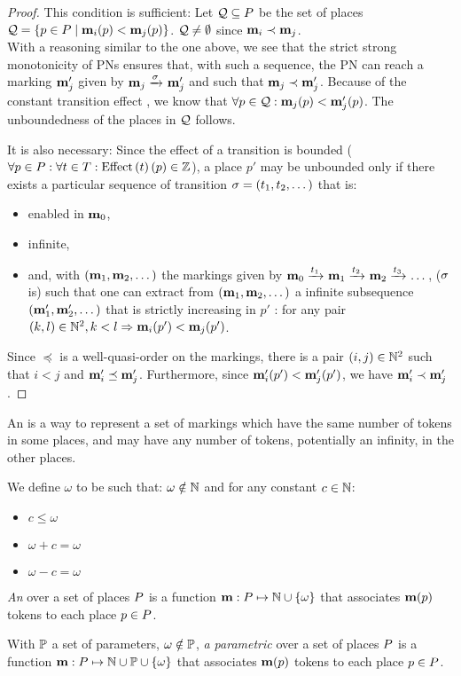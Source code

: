 \begin{proof}
  This condition is sufficient:
  Let $\mathcal{Q} \subseteq P$ be the set of places $\mathcal{Q} = \left\{p \in P \mid  \mathbf{m}_i(p) < \mathbf{m}_j(p)\right\}$.
  $\mathcal{Q} \neq \emptyset$ since $\mathbf{m}_i \prec \mathbf{m}_j$.\\
  With a reasoning similar to the one above, we see that the strict strong monotonicity of \acp{PN} ensures that, with such a sequence, the \ac{PN} can reach a marking $\mathbf{m}'_j$ given by $\mar_j \fire{\seqt} \mar'_j$ and such that $\mathbf{m}_j \prec \mathbf{m}'_j$.
  Because of the constant transition effect , we know that $\forall p \in \mathcal{Q} : \mathbf{m}_j(p) < \mathbf{m}'_j(p)$.
  The unboundedness of the places in $\mathcal{Q}$ follows.

  It is also necessary:
  Since the effect of a transition is bounded ($\forall p \in \places : \forall t \in \transitions : \effect{t}[p] \in \integers$), a place $p'$ may be unbounded only if there exists a particular sequence of transition $\defInfSeqt$ that is:
  \begin{itemize} 
    \item enabled in $\mathbf{m}_0$,
    \item infinite,
    \item and, with $\bodyInfSeq[\mar]$ the markings given by $\mathbf{m}_0 \xrightarrow{t_1}_{} \mathbf{m}_1 \xrightarrow{t_2}_{} \mathbf{m}_2 \xrightarrow{t_3}_{} \dots$, ($\seqt$ is) such that one can extract from $\bodyInfSeq[\mar]$ a infinite subsequence $\bodyInfSeq[\mar']$ that is strictly increasing in $p'$ : for any pair $(k, l) \in \mathbb{N}^2, k < l \Rightarrow \mathbf{m}_i(p') < \mathbf{m}_j(p')$.
  \end{itemize}
  Since $\preceq$ is a well-quasi-order on the markings, there is a pair $(i, j) \in \mathbb{N}^2$ such that $i < j$ and $\mathbf{m}'_i \preceq \mathbf{m}'_j$.
  Furthermore, since $\mathbf{m}'_i(p') < \mathbf{m}'_j(p')$, we have $\mathbf{m}'_i \prec \mathbf{m}'_j$.
\end{proof}

An \omark is a way to represent a set of markings which have the same number of tokens in some places, and may have any number of tokens, potentially an infinity, in the other places.

\begin{defi}[\omark]
  We define \emph{$\omega$} to be such that:
  $\omega \notin \mathbb{N}$
  and for any constant $c \in \mathbb{N}$:
  \begin{itemize}
    \item $c \leq \omega$
    \item $\omega + c = \omega$
    \item $\omega - c = \omega$
  \end{itemize}

  \emph{An \omark} \mar over a set of places $P$ is a function $\mathbf{m} : P \mapsto \mathbb{N} \cup \{\omega\}$ that associates $\mathbf{m}(p)$ tokens to each place $p \in P$.

  With $\mathbb{P}$ a set of parameters, $\omega \notin \mathbb{P}$,
  \emph{a parametric \omark} \mar over a set of places $P$ is a function $\mathbf{m} : P \mapsto \mathbb{N} \cup \mathbb{P} \cup \{\omega\}$ that associates $\mathbf{m}(p)$ tokens to each place $p \in P$.
\end{defi}

